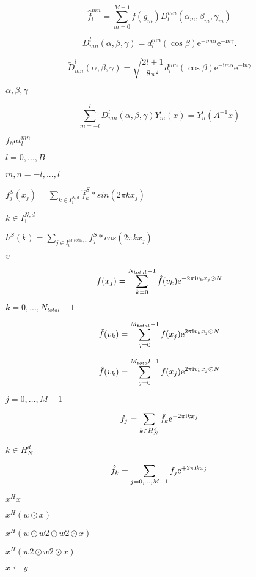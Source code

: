 \documentclass{article}
\begin{document}
\[ \hat{f}^{mn}_l = \sum_{m = 0}^{M-1} f(g_m) D_l^{mn}\left( \alpha_m,\beta_m,\gamma_m\right) \]
\pagebreak

\[ D_{mn}^l(\alpha,\beta,\gamma) = d^{mn}_{l}(\cos\beta) \mathrm{e}^{-\mathrm{i} m \alpha}\mathrm{e}^{-\mathrm{i} n \gamma}. \]
\pagebreak

\[ \tilde D_{mn}^l(\alpha,\beta,\gamma) = \sqrt{\frac{2l+1}{8\pi^2}}d^{mn}_{l}(\cos\beta) \mathrm{e}^{-\mathrm{i} m \alpha}\mathrm{e}^{-\mathrm{i} n \gamma} \]
\pagebreak

$\alpha, \beta, \gamma$
\pagebreak

\[ \sum_{m=-l}^l D_{mn}^l(\alpha,\beta,\gamma) Y_m^l(x) = Y_n^l(A^{-1} x) \]
\pagebreak

$f_hat^{mn}_l$
\pagebreak

$l=0,...,B$
\pagebreak

$m,n =-l,...,l$
\pagebreak

$f_j^S(x_j) = \sum_{k \in I_1^{N,d}} \hat{f}_k^S * sin(2 \pi k x_j)$
\pagebreak

$k \in I_1^{N,d}$
\pagebreak

$h^S(k) = \sum_{j \in I_0^{M\_total,1}} f_j^S * cos(2 \pi k x_j)$
\pagebreak

$v$
\pagebreak

\[ f(x_j) = \sum_{k = 0}^{N_{total}-1} \hat{f}(v_k) {\rm e}^{-2 \pi \mbox{\rm\scriptsize i} v_k x_j \odot N} \]
\pagebreak

$k=0,...,N_{total}-1$
\pagebreak

\[ \hat{f}(v_k) = \sum_{j = 0}^{M_{total}-1} f(x_j) {\rm e}^{2 \pi \mbox{\rm\scriptsize i} v_k x_j \odot N} \]
\pagebreak

\[ \hat{f}(v_k) = \sum_{j = 0}^{M_{tota}l-1} f(x_j) {\rm e}^{2 \pi \mbox{\rm\scriptsize i} v_k x_j \odot N} \]
\pagebreak

$j=0,\dots,M-1$
\pagebreak

\[ f_j = \sum_{k\in H_N^d}\hat f_k {\rm e}^{-2\pi{\rm\scriptsize i}k x_j} \]
\pagebreak

$k\in H_N^d$
\pagebreak

\[ \hat f_k = \sum_{j=0,\dots,M-1} f_j {\rm e}^{+2\pi{\rm\scriptsize i}k x_j} \]
\pagebreak

$x^H x$
\pagebreak

$x^H (w \odot x)$
\pagebreak

$x^H (w\odot w2\odot w2 \odot x)$
\pagebreak

$x^H (w2\odot w2 \odot x)$
\pagebreak

$x \leftarrow y$
\pagebreak
\end{document}
